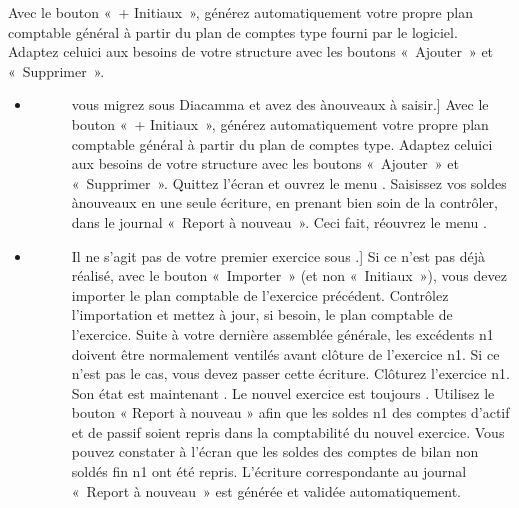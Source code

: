 \documentclass[a4paper,10pt,oneside,french]{sphinxmanual}
\begin{document}
Avec le bouton « + Initiaux », générez automatiquement votre propre plan comptable général à partir du plan de comptes type fourni par le logiciel.
Adaptez celui\sphinxhyphen{}ci aux besoins de votre structure avec les boutons « Ajouter » et « Supprimer ».
\begin{itemize}
\item {} \begin{description}
\item[{}] \leavevmode{[}vous migrez sous Diacamma et avez des à\sphinxhyphen{}nouveaux à saisir.{]}
Avec le bouton « + Initiaux », générez automatiquement votre propre plan comptable général à partir du plan de comptes type.
Adaptez celui\sphinxhyphen{}ci aux besoins de votre structure avec les boutons « Ajouter » et « Supprimer ».
Quittez l’écran  et ouvrez le menu .
Saisissez vos soldes à\sphinxhyphen{}nouveaux en une seule écriture, en prenant bien soin de la contrôler, dans le journal « Report à nouveau ».
Ceci fait, réouvrez le menu .

\end{description}

\item {} \begin{description}
\item[{}] \leavevmode{[}Il ne s’agit pas de votre premier exercice sous .{]}
Si ce n’est pas déjà réalisé, avec le bouton « Importer » (et non « Initiaux »), vous devez importer le plan comptable de l’exercice précédent.
Contrôlez l’importation et mettez à jour, si besoin, le plan comptable de l’exercice.
Suite à votre dernière assemblée générale, les excédents n\sphinxhyphen{}1 doivent être normalement ventilés avant clôture de l’exercice n\sphinxhyphen{}1. Si ce n’est pas le cas, vous devez passer cette écriture.
Clôturez l’exercice n\sphinxhyphen{}1. Son état est maintenant \sphinxstylestrong{{[}terminé{]}}. Le nouvel exercice est toujours \sphinxstylestrong{{[}en création{]}}.
Utilisez le bouton « Report à nouveau » afin que les soldes n\sphinxhyphen{}1 des comptes d’actif et de passif soient repris dans la comptabilité du nouvel exercice. Vous pouvez constater à l’écran que les soldes des comptes de bilan non soldés fin n\sphinxhyphen{}1 ont été repris. L’écriture correspondante  au journal « Report à nouveau » est générée et validée automatiquement.

\end{description}

\end{itemize}
\end{document}
